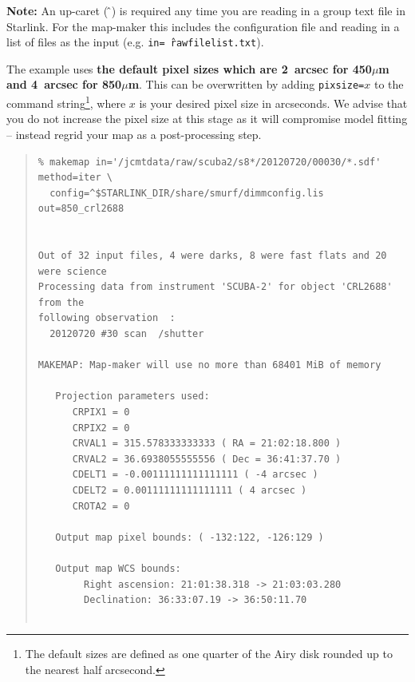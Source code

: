 \documentclass[twoside,11pt]{article}
\newcommand{\htmladdnormallink}[2]{#1}
\renewcommand{\_}{\texttt{\symbol{95}}}
\newenvironment{myquote}{\begin{quote}\begin{small}}{\end{small}\end{quote}}
\newcommand{\starlink}{\htmladdnormallink{Starlink}{http://starlink.jach.hawaii.edu}}
\begin{document}
\textbf{Note:} An up-caret (\,\^\,) is required any time you are reading in
a group text file in \starlink. For the map-maker this includes the
configuration file and reading in a list of files as the input (e.g.
\texttt{in=\^\,rawfilelist.txt}).

The example uses \textbf{the
default pixel sizes which are 2~arcsec for 450$\mu$m and 4~arcsec for
850$\mu$m}. This can be overwritten by adding \texttt{pixsize=}$x$ to the
command string\footnote{The default sizes are defined as one quarter
of the Airy disk rounded up to the nearest half arcsecond.}, where $x$
is your desired pixel size in arcseconds. We advise that you do not
increase the pixel size at this stage as it will compromise model
fitting -- instead regrid your map as a post-processing step.

\begin{myquote}
\begin{verbatim}
% makemap in='/jcmtdata/raw/scuba2/s8*/20120720/00030/*.sdf' method=iter \
  config=^$STARLINK_DIR/share/smurf/dimmconfig.lis out=850_crl2688


Out of 32 input files, 4 were darks, 8 were fast flats and 20 were science
Processing data from instrument 'SCUBA-2' for object 'CRL2688' from the
following observation  :
  20120720 #30 scan  /shutter

MAKEMAP: Map-maker will use no more than 68401 MiB of memory

   Projection parameters used:
      CRPIX1 = 0
      CRPIX2 = 0
      CRVAL1 = 315.578333333333 ( RA = 21:02:18.800 )
      CRVAL2 = 36.6938055555556 ( Dec = 36:41:37.70 )
      CDELT1 = -0.00111111111111111 ( -4 arcsec )
      CDELT2 = 0.00111111111111111 ( 4 arcsec )
      CROTA2 = 0

   Output map pixel bounds: ( -132:122, -126:129 )

   Output map WCS bounds:
        Right ascension: 21:01:38.318 -> 21:03:03.280
        Declination: 36:33:07.19 -> 36:50:11.70


\end{verbatim}
\end{myquote}
\end{document}
